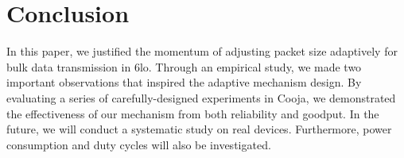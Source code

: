 \documentclass[runningheads,a4paper]{llncs}
\begin{document}
\section{Conclusion}
In this paper, we justified the momentum of adjusting packet size adaptively for bulk data transmission in 6lo. Through an empirical study, we made two important observations that inspired the adaptive mechanism design. By evaluating a series of carefully-designed experiments in Cooja, we demonstrated the effectiveness of our mechanism from both reliability and goodput. In the future, we will conduct a systematic study on real devices. Furthermore, power consumption and duty cycles will also be investigated.



\end{document}

